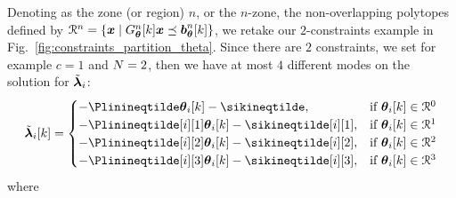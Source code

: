 \documentclass[../main.tex]{subfiles}
\begin{document}
Denoting as the zone (or region) $n$, or the $n$-zone, the non-overlapping polytopes
defined by ${\mathcal{R}^{n}=\{\boldsymbol{x}\mid G_{\boldsymbol{\theta}}^{n}[k]\boldsymbol{x} \preceq \boldsymbol{b}_{\boldsymbol{\theta}}^{n}[k]\}}$,
we retake our $2$-constraints example in Fig.~\ref{fig:constraints_partition_theta}.
Since there are $2$ constraints, we set for example $c=1$ and $N=2$, then we have at most $4$ different modes on the solution for $\tilde{\boldsymbol{\lambda}}_{i}$:
\begin{equation}
  \lambdaicheat[k]=
  \begin{cases}
    -\Plinineqtilde      \thetaik-\sikineqtilde      ,&\text{if }\thetaik\in\set{R}^{0}\\
    -\Plinineqtilde[i][1]\thetaik-\sikineqtilde[i][1],&\text{if }\thetaik\in\set{R}^{1}\\
    -\Plinineqtilde[i][2]\thetaik-\sikineqtilde[i][2],&\text{if }\thetaik\in\set{R}^{2}\\
    -\Plinineqtilde[i][3]\thetaik-\sikineqtilde[i][3],&\text{if }\thetaik\in\set{R}^{3}\\
  \end{cases}\label{eq:1}
\end{equation}
where
\end{document}
